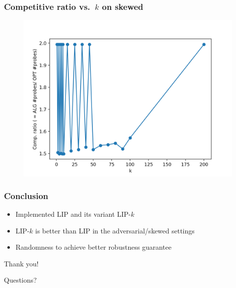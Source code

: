 \documentclass{beamer}
\begin{document}
\begin{frame}
  \frametitle{Competitive ratio vs.\ $k$ on skewed}
  \begin{figure}
    \centering
    \includegraphics[height=0.7\textheight,keepaspectratio]{cr-k-skewed}
  \end{figure}
\end{frame}



\begin{frame}
\frametitle{Conclusion}

  \begin{itemize}
    \item Implemented LIP and its variant LIP-$k$
    \item LIP-$k$ is better than LIP in the adversarial/skewed settings
    \item Randomness to achieve better robustness guarantee
  \end{itemize}
\end{frame}


\begin{frame}
\Huge{Thank you!}
\end{frame}

\begin{frame}
\Huge{Questions?}
\end{frame}
\end{document}
